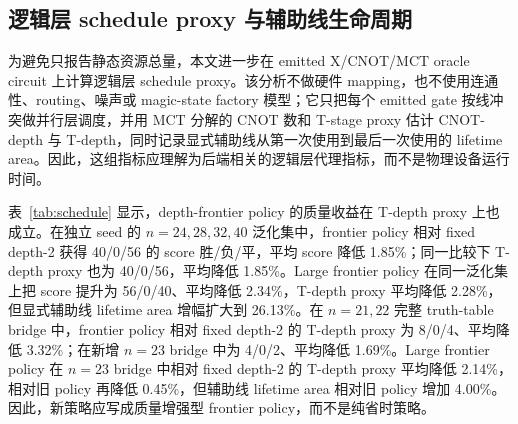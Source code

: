 \documentclass[UTF8,fontset=macnew,11pt]{ctexart}
\newcommand{\ttable}{truth-table}
\newcommand{\mct}{\ensuremath{\mathrm{MCT}}}
\begin{document}
\subsection{逻辑层 schedule proxy 与辅助线生命周期}

为避免只报告静态资源总量，本文进一步在 emitted X/CNOT/\mct{} oracle circuit 上计算逻辑层 schedule proxy。该分析不做硬件 mapping，也不使用连通性、routing、噪声或 magic-state factory 模型；它只把每个 emitted gate 按线冲突做并行层调度，并用 MCT 分解的 CNOT 数和 T-stage proxy 估计 CNOT-depth 与 T-depth，同时记录显式辅助线从第一次使用到最后一次使用的 lifetime area。因此，这组指标应理解为后端相关的逻辑层代理指标，而不是物理设备运行时间。

表~\ref{tab:schedule} 显示，depth-frontier policy 的质量收益在 T-depth proxy 上也成立。在独立 seed 的 $n=24,28,32,40$ 泛化集中，frontier policy 相对 fixed depth-2 获得 40/0/56 的 score 胜/负/平，平均 score 降低 1.85\%；同一比较下 T-depth proxy 也为 40/0/56，平均降低 1.85\%。Large frontier policy 在同一泛化集上把 score 提升为 56/0/40、平均降低 2.34\%，T-depth proxy 平均降低 2.28\%，但显式辅助线 lifetime area 增幅扩大到 26.13\%。在 $n=21,22$ 完整 \ttable{} bridge 中，frontier policy 相对 fixed depth-2 的 T-depth proxy 为 8/0/4、平均降低 3.32\%；在新增 $n=23$ bridge 中为 4/0/2、平均降低 1.69\%。Large frontier policy 在 $n=23$ bridge 中相对 fixed depth-2 的 T-depth proxy 平均降低 2.14\%，相对旧 policy 再降低 0.45\%，但辅助线 lifetime area 相对旧 policy 增加 4.00\%。因此，新策略应写成质量增强型 frontier policy，而不是纯省时策略。
\end{document}
